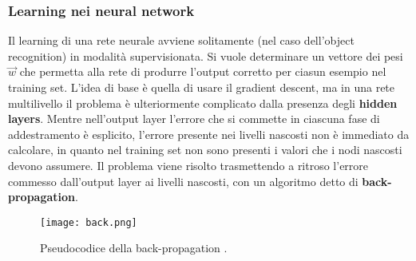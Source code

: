 \subsubsection{Learning nei neural network}
Il learning di una rete neurale avviene solitamente (nel caso dell'object recognition) in modalità supervisionata.  Si vuole determinare un vettore dei pesi $\vec{w}$ che permetta alla rete di produrre l'output corretto per ciasun esempio nel training set.
L'idea di base è quella di usare il gradient descent, ma in una rete multilivello il problema è ulteriormente complicato dalla presenza degli \textbf{hidden layers}. Mentre nell'output layer l'errore che si commette in ciascuna fase di addestramento è esplicito, l'errore presente nei livelli nascosti
non è immediato da calcolare, in quanto nel training set non sono presenti i valori che i nodi nascosti devono assumere. Il problema viene risolto trasmettendo a ritroso
l'errore commesso dall'output layer ai livelli nascosti, con un algoritmo detto di \textbf{back-propagation}.
\begin{figure}[h]
  \texttt{[image: back.png]}
  \caption{Pseudocodice della back-propagation \cite{back}.}
  \label{fig:back}
\end{figure}
